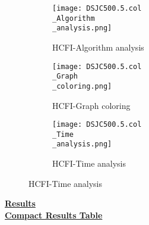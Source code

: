 \documentclass[10pt]{article}
\begin{document}
\graphicspath{{./Core1/Solutions/HCFI/DSJC500.5.col}}
\begin{figure}[H]
\begin{subfigure}{.33\textwidth}
  \centering
  \texttt{[image: DSJC500.5.col\\\_Algorithm\\\_analysis.png]}
  \caption{HCFI-Algorithm analysis}
   \label{fig:subfig1}
\end{subfigure}%
\begin{subfigure}{.33\textwidth}
  \centering
  \texttt{[image: DSJC500.5.col\\\_Graph\\\_coloring.png]}
  \caption{HCFI-Graph coloring}
  \label{fig:subfig2}
\end{subfigure}
\begin{subfigure}{.33\textwidth}
  \centering
  \texttt{[image: DSJC500.5.col\\\_Time\\\_analysis.png]}
  \caption{HCFI-Time analysis}
  \end{subfigure}
\end{figure}
\vspace{2cm}
\begin{center}
\hyperlink{page.8}{\textbf{Results}}\\
\vspace{0.5cm}
\hyperlink{page.71}{\textbf{Compact Results Table}}
\end{center}
\pagebreak
\end{document}
